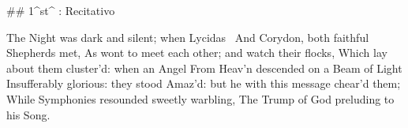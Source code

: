 ## 1^st^ \mvmt: Recitativo

\beginnumbering
\pstart
The Night was dark and silent; when Lycidas \
And Corydon, both faithful Shepherds met,
As wont to meet each other; and watch their flocks,
Which lay about them cluster’d: when an Angel
From Heav’n descended on a Beam of Light
Insufferably glorious: they stood
Amaz’d: but he with this message chear’d them;
While Symphonies resounded sweetly warbling,
The Trump of God preluding to his Song.
\pend
\endnumbering
